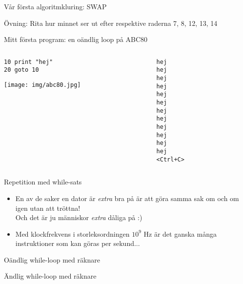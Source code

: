 \documentclass{lecturenotes}
\begin{document}
\begin{Slide}{Vår första algoritmkluring: SWAP}

\footnotesize Övning: Rita hur minnet ser ut efter respektive raderna 7, 8, 12, 13, 14
\end{Slide}


\begin{Slide}{Mitt första program: en oändlig loop på ABC80}
\begin{columns}
\begin{column}{0.8\textwidth}
\begin{verbatim}
10 print "hej"
20 goto 10
\end{verbatim}
\texttt{[image: img/abc80.jpg]}
\end{column}
\begin{column}{0.3\textwidth}
\pause
\begin{verbatim}
hej
hej
hej
hej
hej
hej
hej
hej
hej
hej
hej
hej
<Ctrl+C>
\end{verbatim}

\end{column}
\end{columns}
\end{Slide}

\begin{Slide}{Repetition med while-sats}

\pause
\begin{itemize}
\item En av de saker en dator är \textit{extra} bra på är att göra samma sak om och om igen utan att tröttna! \\
Och det är ju människor \textit{extra} dåliga på :)
\item Med klockfrekvens i storleksordningen $10^9$ Hz är det ganska många instruktioner som kan göras per sekund...
\end{itemize}
\end{Slide}

\begin{Slide}{Oändlig while-loop med räknare}

\end{Slide}

\begin{Slide}{Ändlig while-loop med räknare}

\end{Slide}
\end{document}
